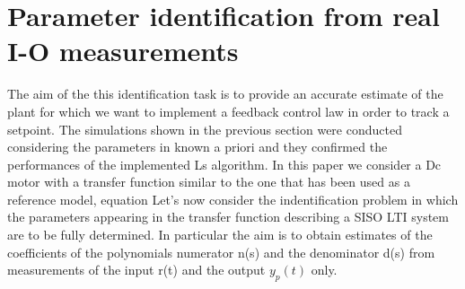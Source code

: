 \section{Parameter identification from real I-O measurements}

The aim of the this identification task is to provide an accurate estimate of the plant for which we want to implement a feedback control law in order to track a setpoint. The simulations shown in the previous section were conducted considering the parameters in %
 known a priori and they confirmed the performances of the implemented Ls algorithm. In this paper we consider a Dc motor with a transfer function similar to the one that has been used as a reference model, equation 
  Let's now consider the indentification problem in which the parameters appearing in the transfer function describing a SISO LTI system are to be fully determined. In particular the aim is to obtain estimates of the coefficients of the polynomials numerator n(s) and the denominator d(s) from measurements of the input r(t) and the output $y_p(t)$ only.
%
%
